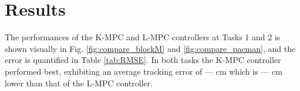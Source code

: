 \section{Results}
\label{sec:results}

The performances of the K-MPC and L-MPC controllers at Tasks 1 and 2 is shown visually in Fig. \ref{fig:compare_blockM} and \ref{fig:compare_pacman}, and the error is quantified in Table \ref{tab:RMSE}.
In both tasks the K-MPC controller performed best, exhibiting an average tracking error of --- cm which is --- cm lower than that of the L-MPC controller.






